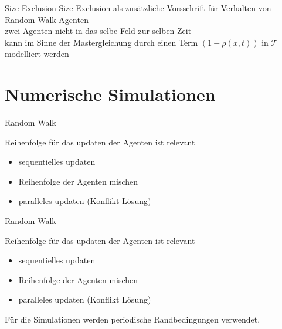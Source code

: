 \documentclass[xcolor=dvipsnames, aspectratio=169]{beamer}
\begin{document}
\begin{frame}{Size Exclusion}
    Size Exclusion als zusätzliche Vorsschrift für Verhalten von Random Walk Agenten
    \vspace{5mm}
    \\
    zwei Agenten nicht in das selbe Feld zur selben Zeit
    \vspace{5mm}
    \\
    kann im Sinne der Mastergleichung durch einen Term $(1-\rho(x,t))$ in $\mathcal{T}$ modelliert werden
    \\
    \vspace{5mm}
    \begin{center}
    \end{center}
\end{frame}

\section{Numerische Simulationen}

\begin{frame}{Random Walk}

Reihenfolge für das updaten der Agenten ist relevant
\vspace{5mm}
\begin{itemize}
\setlength\itemsep{1em}
    \item <2-> sequentielles updaten
    \item <3-> Reihenfolge der Agenten mischen
    \item <4-> paralleles updaten (Konflikt Lösung) 
\end{itemize}
    
\end{frame}

\begin{frame}{Random Walk}

    Reihenfolge für das updaten der Agenten ist relevant
    \vspace{5mm}
    \begin{itemize}
    \setlength\itemsep{1em}
        \item sequentielles updaten
        \item Reihenfolge der Agenten mischen
        \item paralleles updaten (Konflikt Lösung) 
    \end{itemize}
    \vspace{5mm}
    Für die Simulationen werden periodische Randbedingungen verwendet.
        
\end{frame}
\end{document}
